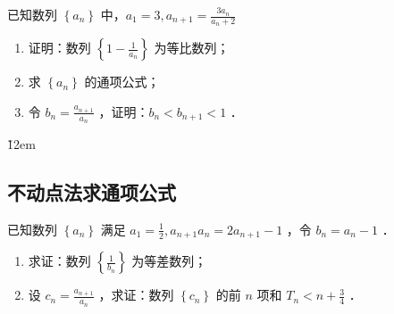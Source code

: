 \begin{example}
    已知数列 $\left\{a_n\right\}$ 中，$a_1=3, a_{n+1}=\frac{3 a_n}{a_n+2}$
    \begin{enumerate}
        \item 证明：数列 $\left\{1-\frac{1}{a_n}\right\}$ 为等比数列；
        \item 求 $\left\{a_n\right\}$ 的通项公式；
        \item 令 $b_n=\frac{a_{n+1}}{a_n}$ ，证明：$b_n<b_{n+1}<1$ ．
    \end{enumerate}
\end{example}

\v{12em}

\subsection{不动点法求通项公式}

\begin{example}
    已知数列 $\left\{a_n\right\}$ 满足 $a_1=\frac{1}{2}, a_{n+1} a_n=2 a_{n+1}-1$ ，令 $b_n=a_n-1$ ．
    \begin{enumerate}
        \item 求证：数列 $\left\{\frac{1}{b_n}\right\}$ 为等差数列；

        \item 设 $c_n=\frac{a_{n+1}}{a_n}$ ，求证：数列 $\left\{c_n\right\}$ 的前 $n$ 项和 $T_n<n+\frac{3}{4}$ ．
    \end{enumerate}
\end{example}


